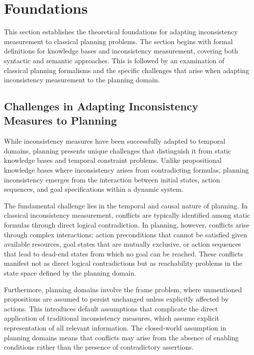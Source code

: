 \section{Foundations}
\label{sec:foundations}

This section establishes the theoretical foundations for adapting inconsistency measurement to classical planning problems. The section begins with formal definitions for knowledge bases and inconsistency measurement, covering both syntactic and semantic approaches. This is followed by an examination of classical planning formalisms and the specific challenges that arise when adapting inconsistency measurement to the planning domain.









\subsection{Challenges in Adapting Inconsistency Measures to Planning}

While inconsistency measures have been successfully adapted to temporal domains, planning presents unique challenges that distinguish it from static knowledge bases and temporal constraint problems. Unlike propositional knowledge bases where inconsistency arises from contradicting formulas, planning inconsistency emerges from the interaction between initial states, action sequences, and goal specifications within a dynamic system.

The fundamental challenge lies in the temporal and causal nature of planning. In classical inconsistency measurement, conflicts are typically identified among static formulas through direct logical contradiction. In planning, however, conflicts arise through complex interactions: action preconditions that cannot be satisfied given available resources, goal states that are mutually exclusive, or action sequences that lead to dead-end states from which no goal can be reached. These conflicts manifest not as direct logical contradictions but as reachability problems in the state space defined by the planning domain.

Furthermore, planning domains involve the frame problem, where unmentioned propositions are assumed to persist unchanged unless explicitly affected by actions. This introduces default assumptions that complicate the direct application of traditional inconsistency measures, which assume explicit representation of all relevant information. The closed-world assumption in planning domains means that conflicts may arise from the absence of enabling conditions rather than the presence of contradictory assertions.

